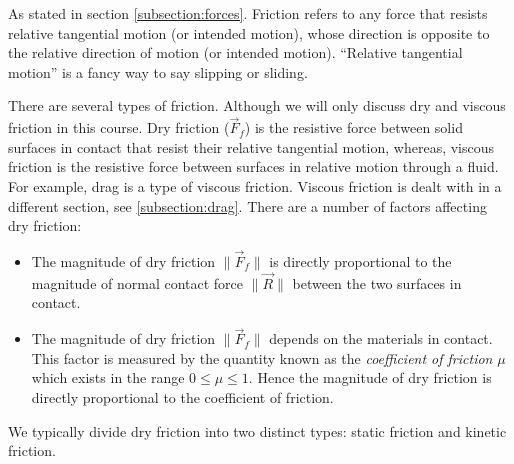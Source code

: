 As stated in section \ref{subsection:forces}. Friction refers to any force that resists relative tangential motion (or intended motion), whose direction is opposite to the relative direction of motion (or intended motion). ``Relative tangential motion'' is a fancy way to say slipping or sliding. 

There are several types of friction. Although we will only discuss dry and viscous friction in this course. Dry friction ($\vec{F}_f$) is the resistive force between solid surfaces in contact that resist their relative tangential motion, whereas, viscous friction is the resistive force between surfaces in relative motion through a fluid. For example, drag is a type of viscous friction. Viscous friction is dealt with in a different section, see \ref{subsection:drag}. There are a number of factors affecting dry friction:
\begin{itemize}
    \item The magnitude of dry friction $\| \vec{F}_f \|$ is directly proportional to the magnitude of normal contact force $\| \vec{R} \|$ between the two surfaces in contact.
    \item The magnitude of dry friction $\| \vec{F}_f \|$ depends on the materials in contact. This factor is measured by the quantity known as the \textit{coefficient of friction} $\mu$ which exists in the range $0 \leq \mu \leq 1$. Hence the magnitude of dry friction is directly proportional to the coefficient of friction.
\end{itemize}

\noindent We typically divide dry friction into two distinct types: static friction and kinetic friction. 

